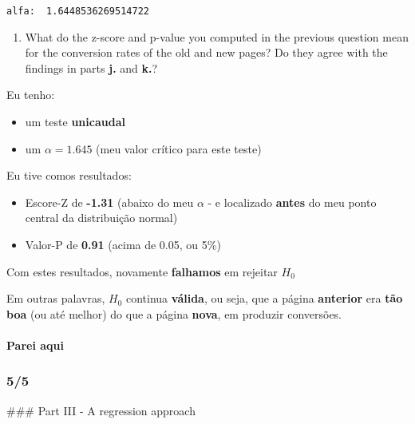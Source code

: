 \documentclass[11pt]{article}
\providecommand{\tightlist}{%
      \setlength{\itemsep}{0pt}\setlength{\parskip}{0pt}}
\begin{document}
    \begin{Verbatim}[commandchars=\\\{\}]
alfa:  1.6448536269514722

    \end{Verbatim}

    \begin{enumerate}
\def\labelenumi{\alph{enumi}.}
\setcounter{enumi}{13}
\tightlist
\item
  What do the z-score and p-value you computed in the previous question
  mean for the conversion rates of the old and new pages? Do they agree
  with the findings in parts \textbf{j.} and \textbf{k.}?
\end{enumerate}

    Eu tenho:

\begin{itemize}
\item
  um teste \textbf{unicaudal}
\item
  um \(\alpha=1.645\) (meu valor crítico para este teste)
\end{itemize}

Eu tive comos resultados:

\begin{itemize}
\item
  Escore-Z de \textbf{-1.31} (abaixo do meu \(\alpha\) - e localizado
  \textbf{antes} do meu ponto central da distribuição normal)
\item
  Valor-P de \textbf{0.91} (acima de 0.05, ou 5\%)
\end{itemize}

Com estes resultados, novamente \textbf{falhamos} em rejeitar \(H_{0}\)

Em outras palavras, \(H_{0}\) continua \textbf{válida}, ou seja, que a
página \textbf{anterior} era \textbf{tão boa} (ou até melhor) do que a
página \textbf{nova}, em produzir conversões.

    \hypertarget{parei-aqui}{%
\paragraph{Parei aqui}\label{parei-aqui}}

    \hypertarget{section}{%
\subsubsection{5/5}\label{section}}

 \#\#\# Part III - A regression approach
\end{document}
